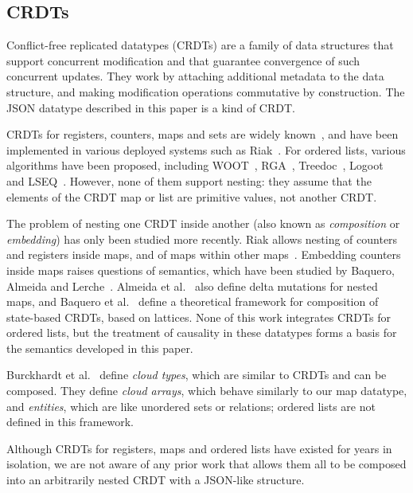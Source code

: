 \documentclass[10pt,journal,compsoc]{IEEEtran}
\begin{document}
\subsection{CRDTs}\label{sec:related-crdts}

Conflict-free replicated datatypes (CRDTs) are a family of data structures that support concurrent modification and that guarantee convergence of such concurrent updates. They work by attaching additional metadata to the data structure, and making modification operations commutative by construction. The JSON datatype described in this paper is a kind of CRDT.

CRDTs for registers, counters, maps and sets are widely known~\cite{Shapiro:2011un,Shapiro:2011wy}, and have been implemented in various deployed systems such as Riak~\cite{Brown:2014hs,Brown:2013wy}. For ordered lists, various algorithms have been proposed, including WOOT~\cite{Oster:2006wj}, RGA~\cite{Roh:2011dw}, Treedoc~\cite{Preguica:2009fz}, Logoot~\cite{Weiss:2010hx} and LSEQ~\cite{Nedelec:2013ky}. However, none of them support nesting: they assume that the elements of the CRDT map or list are primitive values, not another CRDT.

The problem of nesting one CRDT inside another (also known as \emph{composition} or \emph{embedding}) has only been studied more recently. Riak allows nesting of counters and registers inside maps, and of maps within other maps~\cite{Brown:2014hs,Brown:2013wy}. Embedding counters inside maps raises questions of semantics, which have been studied by Baquero, Almeida and Lerche~\cite{Baquero:2016iv}. Almeida et al.~\cite{Almeida:2016tk} also define delta mutations for nested maps, and Baquero et al.~\cite{Baquero:2015tm} define a theoretical framework for composition of state-based CRDTs, based on lattices. None of this work integrates CRDTs for ordered lists, but the treatment of causality in these datatypes forms a basis for the semantics developed in this paper.

Burckhardt et al.~\cite{Burckhardt:2012jy} define \emph{cloud types}, which are similar to CRDTs and can be composed. They define \emph{cloud arrays}, which behave similarly to our map datatype, and \emph{entities}, which are like unordered sets or relations; ordered lists are not defined in this framework.

Although CRDTs for registers, maps and ordered lists have existed for years in isolation, we are not aware of any prior work that allows them all to be composed into an arbitrarily nested CRDT with a JSON-like structure.
\end{document}
